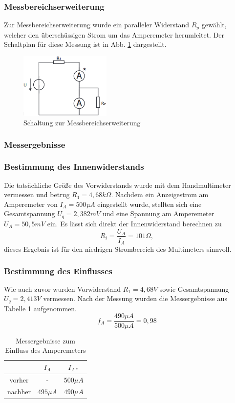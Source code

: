 \documentclass[a4paper]{article}
\begin{document}
\subsubsection*{Messbereichserweiterung}
Zur Messbereichserweiterung wurde ein paralleler Widerstand $R_{p}$ gewählt,
welcher den überschüssigen Strom um das Amperemeter herumleitet. Der Schaltplan
für diese Messung ist in Abb. \ref{fig:2c_MB-ErweiterungAM} dargestellt.

\begin{figure}[h]
    \centering
    \includegraphics[width=0.4\textwidth]{schematics/2c_MessbereichserweiterungAM.png}
    \caption{Schaltung zur Messbereichserweiterung}
    \label{fig:2c_MB-ErweiterungAM}
\end{figure}

\subsubsection{Messergebnisse}
\subsubsection*{Bestimmung des Innenwiderstands}
Die tatsächliche Größe des Vorwiderstands wurde mit dem Handmultimeter vermessen
und betrug $R_{1}=4,68\unit{k\Omega}$.
Nachdem ein Anzeigestrom am Amperemeter von $I_{A}=500\unit{µA}$ eingestellt wurde,
stellten sich eine Gesamtspannung $U_{q}=2,382\unit{mV}$ und eine Spannung am
Amperemeter $U_{A}=50,5 \unit{mV}$ ein.\newline
Es lässt sich direkt der Innenwiderstand berechnen zu
\[ R_{i}= \frac{U_{A}}{I_{A}}= 101\unit{\Omega} ,\]
dieses Ergebnis ist für den niedrigen Strombereich des Multimeters sinnvoll.

\subsubsection*{Bestimmung des Einflusses}
Wie auch zuvor wurden Vorwiderstand $R_{1}=4,68\unit{V}$ sowie
Gesamtspannung $U_{q}=2,413V$ vermessen. Nach der Messung wurden die
Messergebnisse aus Tabelle \ref{tab:2b_EinflussAM} aufgenommen.
\[ f_{A}=\frac{490\unit{\mu A}}{500\unit{\mu A}} =0,98\]
\begin{table}[h]
    \centering
    \caption{Messergebnisse zum Einfluss des Amperemeters}
    \label{tab:2b_EinflussAM}
    \begin{tabular}{|c|c|c|}
        \hline
     & $I_{A}$  & $I_{A*}$\\ 
     \hline
        vorher & - & $500\unit{\mu A}$ \\
        \hline
        nachher & $495\unit{\mu A}$ & $490\unit{\mu A}$\\
     \hline
    \end{tabular}
\end{table}
\end{document}
